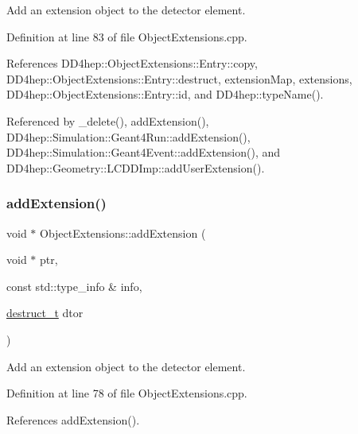 Add an extension object to the detector element. 



Definition at line 83 of file Object\+Extensions.\+cpp.



References D\+D4hep\+::\+Object\+Extensions\+::\+Entry\+::copy, D\+D4hep\+::\+Object\+Extensions\+::\+Entry\+::destruct, extension\+Map, extensions, D\+D4hep\+::\+Object\+Extensions\+::\+Entry\+::id, and D\+D4hep\+::type\+Name().



Referenced by \+\_\+delete(), add\+Extension(), D\+D4hep\+::\+Simulation\+::\+Geant4\+Run\+::add\+Extension(), D\+D4hep\+::\+Simulation\+::\+Geant4\+Event\+::add\+Extension(), and D\+D4hep\+::\+Geometry\+::\+L\+C\+D\+D\+Imp\+::add\+User\+Extension().

\hypertarget{class_d_d4hep_1_1_object_extensions_a9e4010c2b9cbfda1455c10821a3cae85}{}\label{class_d_d4hep_1_1_object_extensions_a9e4010c2b9cbfda1455c10821a3cae85} 
\subsubsection{\texorpdfstring{add\+Extension()}{addExtension()}\hspace{0.1cm}{\footnotesize\ttfamily [2/2]}}
{\footnotesize\ttfamily void $\ast$ Object\+Extensions\+::add\+Extension (\begin{DoxyParamCaption}\item[{void $\ast$}]{ptr,  }\item[{const std\+::type\+\_\+info \&}]{info,  }\item[{\hyperlink{class_d_d4hep_1_1_object_extensions_a705a3524f9097577069a83993a39a9b2}{destruct\+\_\+t}}]{dtor }\end{DoxyParamCaption})}



Add an extension object to the detector element. 



Definition at line 78 of file Object\+Extensions.\+cpp.



References add\+Extension().

\hypertarget{class_d_d4hep_1_1_object_extensions_a8f55762fa8f1701f8fda19a25b027168}{}\label{class_d_d4hep_1_1_object_extensions_a8f55762fa8f1701f8fda19a25b027168} 
